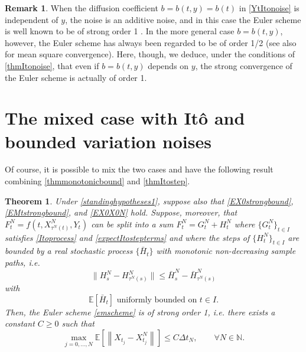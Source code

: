 \documentclass[reqno,12pt]{amsart}
\theoremstyle{plain} %
\newtheorem{theorem}{Theorem}[section]
\theoremstyle{definition} %
\newtheorem{remark}{Remark}[section]
\begin{document}
\begin{remark}
    When the diffusion coefficient $b = b(t, y) = b(t)$ in \eqref{YtItonoise} is independent of $y$, the noise is an additive noise, and in this case the Euler scheme is well known to be of strong order 1 \cite[Section 19.3.1]{HighamKloeden2021}. In the more general case $b=b(t, y)$, however, the Euler scheme has always been regarded to be of order 1/2 \cite{GruneKloeden2001} (see also \cite{WangCaoHanKloeden2021} for mean square convergence). Here, though, we deduce, under the conditions of \cref{thmItonoise}, that even if $b=b(t, y)$ depends on $y$, the strong convergence of the Euler scheme is actually of order 1.    
\end{remark}

\section{The mixed case with It\^o and bounded variation noises}
\label{secmixed}

Of course, it is possible to mix the two cases and have the following result combining \cref{thmmonotonicbound} and \cref{thmItostep}.

\begin{theorem}
    \label{thmmixedcase}
    Under \cref{standinghypotheses1}, suppose also that
    \eqref{EX0strongbound}, \eqref{EMtstrongbound}, and \eqref{EX0X0N} hold. Suppose, moreover, that $F_t^N = f(t, X_{\tau^N(t)}^N, Y_t)$ can be split into a sum $F_t^N = G_t^N + H_t^N$ where $\{G_t^N\}_{t\in I}$ satisfies \eqref{Itoprocess} and \eqref{expectItostepterms} and where the steps of $\{H_t^N\}_{t\in I}$ are bounded by a real stochastic process $\{\bar H_t\}$ with monotonic non-decreasing sample paths, i.e.
    \begin{equation}
        \label{stepHbound}
        \|H_s^N - H_{\tau^N(s)}^N\| \leq \bar H_s^N - \bar H_{\tau^N(s)}^N
    \end{equation}
    with
    \begin{equation}
      \label{expectstepHmonotonic}
      \mathbb{E}[\bar H_t] \textrm{ uniformly bounded on } t\in I.
    \end{equation}
    Then, the Euler scheme \eqref{emscheme} is of strong order 1, i.e. there exists a constant $C\geq 0$ such that
    \begin{equation}
      \label{thmmixedtrongordernew}
        \max_{j=0, \ldots, N}\mathbb{E}\left[ \left\| X_{t_j} - X_{t_j}^N \right\| \right] \leq C \Delta t_N, \qquad \forall N \in \mathbb{N}.
    \end{equation}
\end{theorem}
\end{document}
